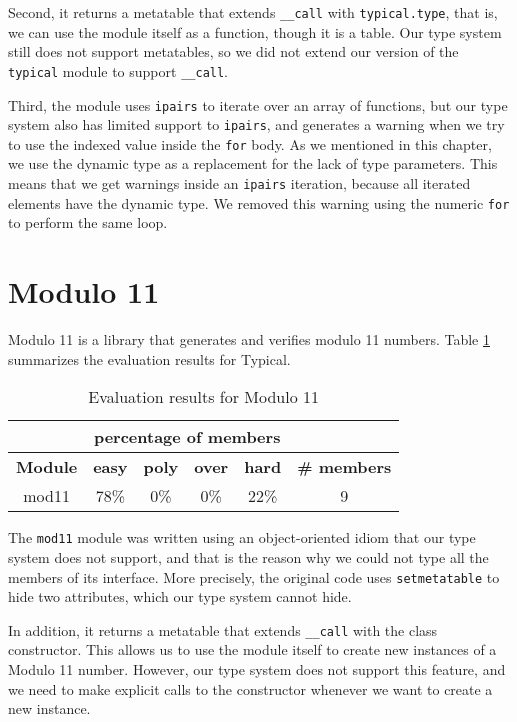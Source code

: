 Second, it returns a metatable that extends \texttt{\string_\string_call}
with \texttt{typical.type}, that is, we can use the module itself as a function,
though it is a table.
Our type system still does not support metatables, so we did not extend our version
of the \texttt{typical} module to support \texttt{\string_\string_call}.

Third, the module uses \texttt{ipairs} to iterate over an array of functions,
but our type system also has limited support to \texttt{ipairs}, and generates
a warning when we try to use the indexed value inside the \texttt{for} body.
As we mentioned in this chapter, we use the dynamic type as a replacement for
the lack of type parameters.
This means that we get warnings inside an \texttt{ipairs} iteration, because
all iterated elements have the dynamic type.
We removed this warning using the numeric \texttt{for} to perform the same loop.

\section{Modulo 11}

Modulo 11 is a library that generates and verifies modulo 11 numbers.
Table \ref{tab:evalmod11} summarizes the evaluation results for Typical.

\begin{table}[!ht]
\begin{center}
\begin{tabular}{|c|c|c|c|c|c|}
\cline{2-5}
\multicolumn{1}{c}{} & \multicolumn{4}{|c|}{percentage of members} & \multicolumn{1}{c}{} \\
\hline
\textbf{Module} & \textbf{easy} & \textbf{poly} & \textbf{over} & \textbf{hard} & \textbf{\# members} \\
\hline
mod11 & 78\% & 0\% & 0\% & 22\% & 9 \\ %
\hline
\end{tabular}
\end{center}
\caption{Evaluation results for Modulo 11}
\label{tab:evalmod11}
\end{table}

The \texttt{mod11} module was written using an object-oriented idiom that
our type system does not support, and that is the reason why we could not
type all the members of its interface.
More precisely, the original code uses \texttt{setmetatable} to hide
two attributes, which our type system cannot hide.

In addition, it returns a metatable that extends \texttt{\string_\string_call}
with the class constructor.
This allows us to use the module itself to create new instances of a
Modulo 11 number.
However, our type system does not support this feature, and we need to
make explicit calls to the constructor whenever we want to create a
new instance.

